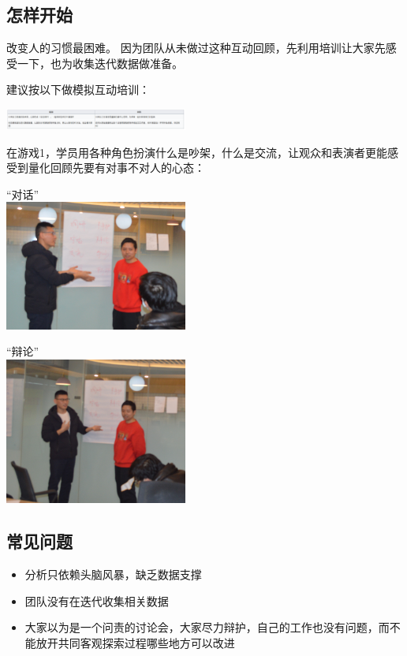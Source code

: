 \hypertarget{ux600eux6837ux5f00ux59cb}{%
\subsection{怎样开始}\label{ux600eux6837ux5f00ux59cb}}

改变人的习惯最困难。
因为团队从未做过这种互动回顾，先利用培训让大家先感受一下，也为收集迭代数据做准备。

建议按以下做模拟互动培训：


\includegraphics[width=6cm]{Screenshotfrom2022-12-2921-12-44.png}

在游戏1，学员用各种角色扮演什么是吵架，什么是交流，让观众和表演者更能感受到量化回顾先要有对事不对人的心态：

“对话”\\

\includegraphics[width=6cm]{1498.png}

“辩论” \\

\includegraphics[width=6cm]{1499.png}

\hypertarget{ux5e38ux89c1ux95eeux9898}{%
\subsection{常见问题}\label{ux5e38ux89c1ux95eeux9898}}

\begin{itemize}
\tightlist
\item
  分析只依赖头脑风暴，缺乏数据支撑
\item
  团队没有在迭代收集相关数据
\item
  大家以为是一个问责的讨论会，大家尽力辩护，自己的工作也没有问题，而不能放开共同客观探索过程哪些地方可以改进
\end{itemize}

